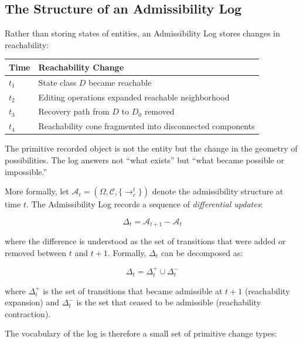 \documentclass[12pt, a4paper]{article}
\theoremstyle{plain}
\theoremstyle{definition}
\theoremstyle{remark}
\begin{document}
\subsection{The Structure of an Admissibility Log}

Rather than storing states of entities, an Admissibility Log stores changes
in reachability:

\begin{center}
\begin{tabular}{ll}
\toprule
\textbf{Time} & \textbf{Reachability Change} \\
\midrule
$t_1$ & State class $D$ became reachable \\
$t_2$ & Editing operations expanded reachable neighborhood \\
$t_3$ & Recovery path from $D$ to $D_0$ removed \\
$t_4$ & Reachability cone fragmented into disconnected components \\
\bottomrule
\end{tabular}
\end{center}

The primitive recorded object is not the entity but the change in the
geometry of possibilities. The log answers not ``what exists'' but ``what
became possible or impossible.''

More formally, let $\mathcal{A}_t = (\Omega, \mathcal{C}, \{\to_c^t\})$
denote the admissibility structure at time $t$. The Admissibility Log
records a sequence of \emph{differential updates}:

$$\Delta_t = \mathcal{A}_{t+1} - \mathcal{A}_t$$

where the difference is understood as the set of transitions that were added
or removed between $t$ and $t+1$. Formally, $\Delta_t$ can be decomposed as:

$$\Delta_t = \Delta_t^+ \cup \Delta_t^-$$

where $\Delta_t^+$ is the set of transitions that became admissible at $t+1$
(reachability expansion) and $\Delta_t^-$ is the set that ceased to be
admissible (reachability contraction).

The vocabulary of the log is therefore a small set of primitive change types:
\end{document}
